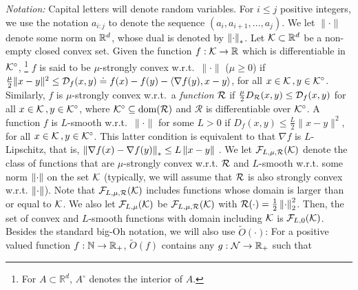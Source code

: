
\textit{Notation:} Capital letters will denote random variables.
For $i\le j$ positive integers,
 we use the notation $a_{i:j}$ to denote
 the sequence $(a_i,a_{i+1}, \dots, a_{j})$.
 We let $\| \cdot \|$ denote some norm on $\mathbb{R}^d$, whose dual is denoted by $\left\|\cdot\right\|_*$. 
 Let $\mathcal{K} \subset \mathbb{R}^d$ be a non-empty closed convex  set. 
 Given the function $f:\mathcal{K} \to \mathbb{R}$ which is differentiable%
  in $\mathcal{K}^\circ$,%
  \footnote{For $A\subset \mathbb{R}^d$, $A^\circ$ denotes the interior of $A$.}
 $f$ is said to be $\mu$-strongly convex w.r.t.\  $\| \cdot \|$  ($\mu\ge 0$) if
 $\tfrac{\mu}{2} \|x-y\|^2 \le \mathcal{D}_f(x,y)\doteq f(x)-f(y)-\langle \nabla f(y),x-y \rangle$, for all $x \in \mathcal{K} \,, y \in \mathcal{K}^\circ$.
Similarly, $f$ is $\mu$-strongly convex w.r.t.\  a \emph{function} $\mathcal{R}$
	if $\tfrac{\mu}{2}D_{\mathcal{R}}(x,y)\le\mathcal{D}_f(x,y)$ for all $x \in \mathcal{K} \,, y \in \mathcal{K}^\circ$, where $\mathcal{K}^\circ\subseteq \operatorname{dom}(\mathcal{R})$ and $\mathcal{R}$ is differentiable over $\mathcal{K}^\circ$.
 A function $f$ is $L$-smooth w.r.t.\  $\| \cdot \| $ for some $L>0$ if
$D_f(x,y) \le \tfrac{L}{2} \|x-y\|^2$, for all $x \in \mathcal{K} \,, y \in \mathcal{K}^\circ$.
 This latter condition is equivalent to that $\nabla f$ is $L$-Lipschitz, that is, 
 $\left\|\nabla f(x) - \nabla f(y)\right\|_* \le L \left\|x-y\right\|$ \citep[Theorem~2.1.5]{nesterov2004introductory}.
 We let $\mathcal{F}_{L,\mu, \mathcal{R}}(\mathcal{K})$ denote the class of functions that are $\mu$-strongly convex w.r.t. $\mathcal{R}$ and $L$-smooth w.r.t. some norm $\left\|\cdot\right\|$ on the set $\mathcal{K}$ (typically, we will assume that $\mathcal{R}$ is also strongly convex w.r.t. $\left\|\cdot\right\|$).
 Note that $\mathcal{F}_{L,\mu,\mathcal{R}}(\mathcal{K})$ includes functions whose domain is larger than or equal to $\mathcal{K}$.
We also let $\mathcal{F}_{L,\mu}(\mathcal{K})$ be $\mathcal{F}_{L,\mu,\mathcal{R}}(\mathcal{K})$ with $\mathcal{R}(\cdot) = \frac12 \left\|\cdot\right\|_2^2$.
Then, the set of convex and $L$-smooth functions with domain including $\mathcal{K}$ is  $\mathcal{F}_{L,0}(\mathcal{K})$.
Besides the standard big-Oh notation, we will also use $\tilde{O}(\cdot)$:
For a positive valued function $f: \mathbb{N} \to \mathbb{R}_+$, $\tilde{O}(f)$ contains any $g:\mathcal{N} \to \mathbb{R}_+$ such that
